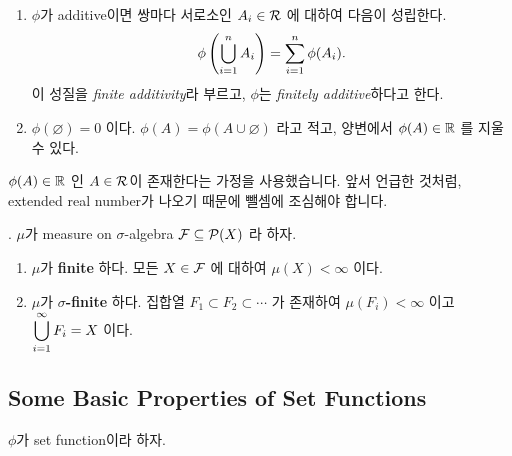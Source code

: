 \medskip

\rmk
\begin{enumerate}
    \item \(\phi\)가 additive이면 쌍마다 서로소인 \(A_i \in \mathcal{R}\) 에 대하여 다음이 성립한다.
          \[
              \phi\left( \bigcup_{i=1}^n A_i \right) = \sum_{i=1}^n \phi(A_i).
          \]
          이 성질을 \textit{finite additivity}라 부르고, \(\phi\)는 \textit{finitely additive}하다고 한다.

    \item \(\phi(\varnothing) = 0\) 이다. \(\phi(A) = \phi(A \cup \varnothing)\) 라고 적고, 양변에서 \(\phi(A) \in \mathbb{R}\) 를 지울 수 있다.
\end{enumerate}

\(\phi(A) \in \mathbb{R}\) 인 \(A \in \mathcal{R}\)이 존재한다는 가정을 사용했습니다. 앞서 언급한 것처럼, extended real number가 나오기 때문에 뺄셈에 조심해야 합니다.

\medskip

. \(\mu\)가 measure on \(\sigma\)-algebra \(\mathcal{F} \subseteq \mathcal{P}(X)\) 라 하자.
\begin{enumerate}
    \item \(\mu\)가 \textbf{finite} 하다. \miff 모든 \(X \in \mathcal{F}\) 에 대하여 \(\mu(X) < \infty\) 이다.
    \item \(\mu\)가 \textbf{\(\sigma\)-finite} 하다. \miff 집합열 \(F_1 \subset F_2 \subset \cdots\) 가 존재하여 \(\mu(F_i) < \infty \) 이고 \(\displaystyle \bigcup_{i=1}^\infty F_i = X\) 이다.
\end{enumerate}

\subsection*{Some Basic Properties of Set Functions}

\(\phi\)가 set function이라 하자.

